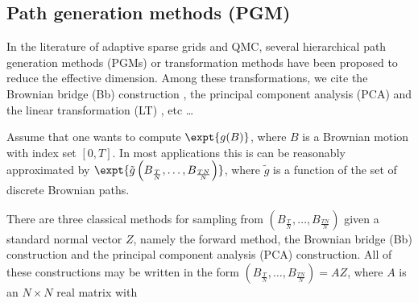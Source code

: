 \subsection{Path generation methods (PGM)}\label{sec:Path generation methods (PGM)}

In the literature of adaptive sparse grids and  QMC, several hierarchical path generation methods (PGMs) or transformation methods have been proposed to reduce the effective dimension. Among these transformations, we cite the Brownian bridge (Bb)  construction \cite{moskowitz1996smoothness,caflisch1997valuation,morokoff1998generating,larcher2003tractability}, the principal component analysis (PCA)  \cite{acworth1998comparison} and the linear transformation (LT) \cite{imai2004minimizing}, etc \dots 

Assume that one wants to compute $\expt{g(B)}$, where $B$ is a Brownian motion with index set $[0,T]$. In most applications this is can be reasonably approximated by $\expt{\tilde{g}\left(B_{\frac{T}{N}}, \dots, B_{\frac{T N}{N}}  \right)}$, where $\tilde{g}$ is a function of the set of discrete Brownian paths.

There are three classical methods for sampling from $\left(B_{\frac{T}{N}}, \dots, B_{\frac{T N}{N}}  \right)$ given a standard normal vector $Z$, namely the forward method, the Brownian bridge (Bb) construction and the principal component analysis (PCA) construction. All of these constructions may be written in the form $\left(B_{\frac{T}{N}}, \dots, B_{\frac{T N}{N}}  \right)=AZ$, where $A$ is an $N \times N$ real matrix with 

